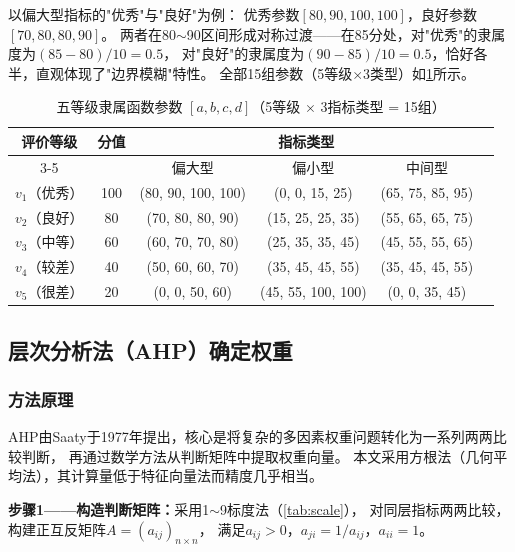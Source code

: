 \documentclass[a4paper,12pt]{ctexart}
\begin{document}
以偏大型指标的"优秀"与"良好"为例：
优秀参数$[80,90,100,100]$，良好参数$[70,80,80,90]$。
两者在80$\sim$90区间形成对称过渡——在85分处，对"优秀"的隶属度为$(85-80)/10 = 0.5$，
对"良好"的隶属度为$(90-85)/10 = 0.5$，恰好各半，直观体现了"边界模糊"特性。
全部15组参数（5等级$\times$3类型）如\cref{tab:params}所示。

\begin{table}[H]
\centering
\caption{五等级隶属函数参数 $[a,b,c,d]$（5等级 $\times$ 3指标类型 = 15组）}
\label{tab:params}
\begin{tabular}{cccccc}
\toprule
\multirow{2}{*}{评价等级} & \multirow{2}{*}{分值} &
\multicolumn{3}{c}{指标类型} \\
\cmidrule(lr){3-5}
& & 偏大型 & 偏小型 & 中间型 \\
\midrule
$v_1$（优秀） & 100 & (80, 90, 100, 100) & (0, 0, 15, 25)  & (65, 75, 85, 95) \\
$v_2$（良好） & 80  & (70, 80, 80, 90)   & (15, 25, 25, 35) & (55, 65, 65, 75) \\
$v_3$（中等） & 60  & (60, 70, 70, 80)   & (25, 35, 35, 45) & (45, 55, 55, 65) \\
$v_4$（较差） & 40  & (50, 60, 60, 70)   & (35, 45, 45, 55) & (35, 45, 45, 55) \\
$v_5$（很差） & 20  & (0, 0, 50, 60)     & (45, 55, 100, 100) & (0, 0, 35, 45) \\
\bottomrule
\end{tabular}
\end{table}

\subsection{层次分析法（AHP）确定权重}

\subsubsection{方法原理}

AHP由Saaty于1977年提出，核心是将复杂的多因素权重问题转化为一系列两两比较判断，
再通过数学方法从判断矩阵中提取权重向量\cite{saaty1980}。
本文采用方根法（几何平均法），其计算量低于特征向量法而精度几乎相当。

\textbf{步骤1——构造判断矩阵：}采用1$\sim$9标度法（\cref{tab:scale}），
对同层指标两两比较，构建正互反矩阵$A=(a_{ij})_{n\times n}$，
满足$a_{ij}>0$，$a_{ji}=1/a_{ij}$，$a_{ii}=1$。
\end{document}
